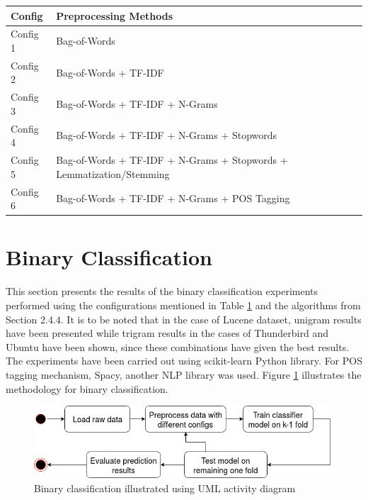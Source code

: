 \documentclass[a4paper,12pt,twoside]{report}
\begin{document}
\begin{table} %
    \centering
    \begin{adjustbox}{max width=\columnwidth}
    \def\arraystretch{1} %
    \begin{tabular}{p{2cm} p{13cm}}
        \toprule
        \textbf{Config} & \textbf{Preprocessing Methods} \\
        \midrule
			Config 1 & Bag-of-Words \\
			Config 2 & Bag-of-Words + TF-IDF \\ 
			Config 3 & Bag-of-Words + TF-IDF + N-Grams \\
			Config 4 & Bag-of-Words + TF-IDF + N-Grams + Stopwords \\
			Config 5 & Bag-of-Words + TF-IDF + N-Grams + Stopwords + Lemmatization/Stemming \\
			Config 6 & Bag-of-Words + TF-IDF + N-Grams + \acs{POS} Tagging \\
        \midrule
    \end{tabular}
    \end{adjustbox}
    \label{tab:configurationNames}
\end{table} 

\section{Binary Classification}
This section presents the results of the binary classification experiments performed using the configurations mentioned in Table \ref{tab:configurationNames} and the algorithms from Section 2.4.4. It is to be noted that in the case of Lucene dataset, unigram results have been presented while trigram results in the cases of Thunderbird and Ubuntu have been shown, since these combinations have given the best results. The experiments have been carried out using scikit-learn Python library. For \acs{POS} tagging mechanism, Spacy, another \acs{NLP} library was used. Figure \ref{fig:binaryClass} illustrates the methodology for binary classification. 

\begin{figure}[h] %
    \centering
    \includegraphics[width=12cm]{binary-classification}
    \caption{Binary classification illustrated using UML activity diagram}
    \label{fig:binaryClass}
\end{figure}
\end{document}
